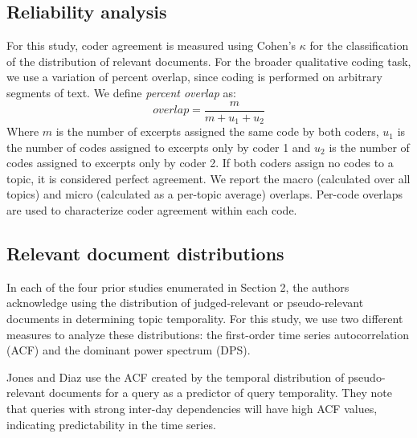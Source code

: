\documentclass{sig-alternate-05-2015}
\begin{document}
\subsection{Reliability analysis}

For this study, coder agreement is measured using Cohen's $\kappa$ for the classification of the distribution of relevant documents. For the broader qualitative coding task, we use a variation of percent overlap, since coding is performed on arbitrary segments of text. We define \emph{percent overlap} as:
\[
overlap = \frac{m}{m + u_1 + u_2} 
\]
Where $m$ is the number of excerpts assigned the same code by both coders, $u_1$ is the number of codes assigned to excerpts only by coder 1 and $u_2$ is the number of codes assigned to excerpts only by coder 2. If both coders assign no codes to a topic, it is considered perfect agreement. We report the macro (calculated over all topics) and micro (calculated as a per-topic average) overlaps.  Per-code overlaps are used to characterize coder agreement within each code.

\subsection{Relevant document distributions}

In each of the four prior studies enumerated in Section 2, the authors acknowledge using the distribution of judged-relevant or pseudo-relevant documents in determining topic temporality. For this study, we use two different measures to analyze these distributions: the first-order time series autocorrelation (ACF) and the dominant power spectrum (DPS).

Jones and Diaz \cite{Jones2007} use the ACF created by the temporal distribution of pseudo-relevant documents for a query as a predictor of query temporality. They note that queries with strong inter-day dependencies will have high ACF values, indicating predictability in the time series. 

\end{document}
